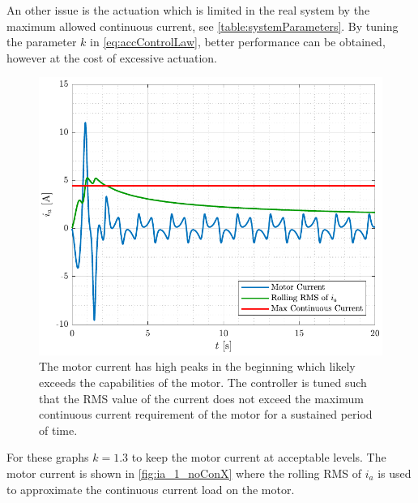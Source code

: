 %
An other issue is the actuation which is limited in the real system by the maximum allowed continuous current, see \autoref{table:systemParameters}. By tuning the parameter $k$ in \autoref{eq:accControlLaw}, better performance can be obtained, however at the cost of excessive actuation.
%
\begin{figure}[H]
  \includegraphics[width=.52\textwidth]{figures/ia_1_noConX}
  \caption{The motor current has high peaks in the beginning which likely exceeds the capabilities of the motor. The controller is tuned such that the RMS value of the current does not exceed the maximum continuous current requirement of the motor for a sustained period of time.}
  \label{fig:ia_1_noConX}
\end{figure}
%
For these graphs $k=1.3$ to keep the motor current at acceptable levels. The motor current is shown in \autoref{fig:ia_1_noConX} where the rolling RMS of $i_a$ is used to approximate the continuous current load on the motor.



